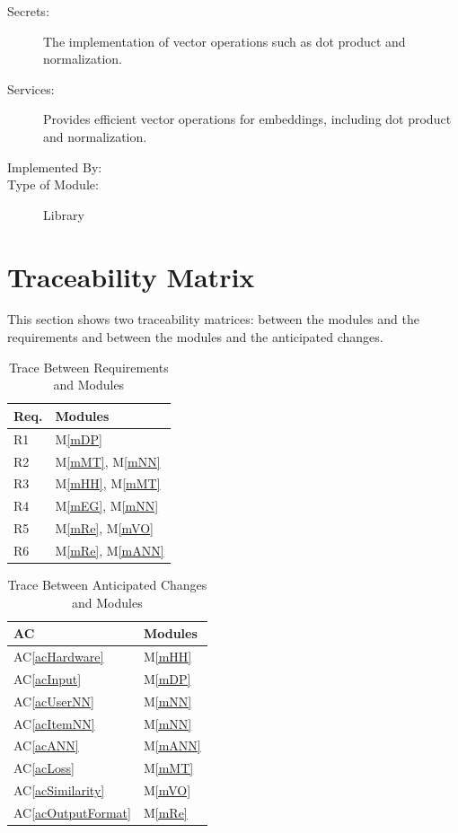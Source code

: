 \documentclass[12pt, titlepage]{article}
\newcommand{\acref}[1]{AC\ref{#1}}
\newcommand{\mref}[1]{M\ref{#1}}
\begin{document}
\begin{description}
\item[Secrets:]The implementation of vector operations such as dot product and normalization.
\item[Services:]Provides efficient vector operations for embeddings, including dot product and normalization.
\item[Implemented By:] \progname
\item[Type of Module:] Library
\end{description}

\section{Traceability Matrix} \label{SecTM}

This section shows two traceability matrices: between the modules and the
requirements and between the modules and the anticipated changes.

\begin{table}[H]
\centering
\begin{tabular}{p{} p{}}
\toprule
\textbf{Req.} & \textbf{Modules}\\
\midrule
R1 & \mref{mDP}\\
R2 & \mref{mMT}, \mref{mNN}\\
R3 & \mref{mHH}, \mref{mMT}\\
R4 & \mref{mEG}, \mref{mNN}\\
R5 & \mref{mRe}, \mref{mVO}\\
R6 & \mref{mRe}, \mref{mANN}\\
\bottomrule
\end{tabular}
\caption{Trace Between Requirements and Modules}
\label{TblRT}
\end{table}

\begin{table}[H]
\centering
\begin{tabular}{p{} p{}}
\toprule
\textbf{AC} & \textbf{Modules}\\
\midrule
\acref{acHardware} & \mref{mHH}\\
\acref{acInput} & \mref{mDP}\\
\acref{acUserNN} & \mref{mNN}\\
\acref{acItemNN} & \mref{mNN}\\
\acref{acANN} & \mref{mANN}\\
\acref{acLoss} & \mref{mMT}\\
\acref{acSimilarity} & \mref{mVO}\\
\acref{acOutputFormat} & \mref{mRe}\\
\bottomrule
\end{tabular}
\caption{Trace Between Anticipated Changes and Modules}
\label{TblACT}
\end{table}
\end{document}

